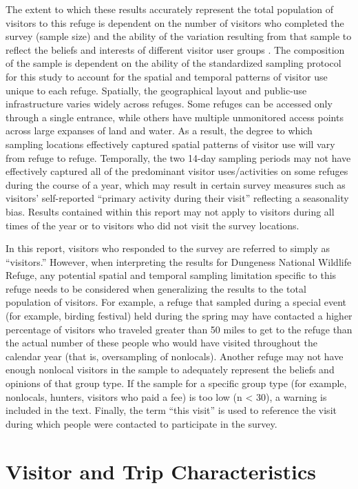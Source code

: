 \documentclass[]{book}
\begin{document}
The extent to which these results accurately represent the total
population of visitors to this refuge is dependent on the number of
visitors who completed the survey (sample size) and the ability of the
variation resulting from that sample to reflect the beliefs and
interests of different visitor user groups \citep{scheaffer1996}. The
composition of the sample is dependent on the ability of the
standardized sampling protocol for this study to account for the spatial
and temporal patterns of visitor use unique to each refuge. Spatially,
the geographical layout and public-use infrastructure varies widely
across refuges. Some refuges can be accessed only through a single
entrance, while others have multiple unmonitored access points across
large expanses of land and water. As a result, the degree to which
sampling locations effectively captured spatial patterns of visitor use
will vary from refuge to refuge. Temporally, the two 14-day sampling
periods may not have effectively captured all of the predominant visitor
uses/activities on some refuges during the course of a year, which may
result in certain survey measures such as visitors' self-reported
``primary activity during their visit'' reflecting a seasonality bias.
Results contained within this report may not apply to visitors during
all times of the year or to visitors who did not visit the survey
locations.

In this report, visitors who responded to the survey are referred to
simply as ``visitors.'' However, when interpreting the results for
Dungeness National Wildlife Refuge, any potential spatial and temporal
sampling limitation specific to this refuge needs to be considered when
generalizing the results to the total population of visitors. For
example, a refuge that sampled during a special event (for example,
birding festival) held during the spring may have contacted a higher
percentage of visitors who traveled greater than 50 miles to get to the
refuge than the actual number of these people who would have visited
throughout the calendar year (that is, oversampling of nonlocals).
Another refuge may not have enough nonlocal visitors in the sample to
adequately represent the beliefs and opinions of that group type. If the
sample for a specific group type (for example, nonlocals, hunters,
visitors who paid a fee) is too low (n \textless{} 30), a warning is
included in the text. Finally, the term ``this visit'' is used to
reference the visit during which people were contacted to participate in
the survey.

\chapter{Visitor and Trip Characteristics}\label{visit}
\end{document}
